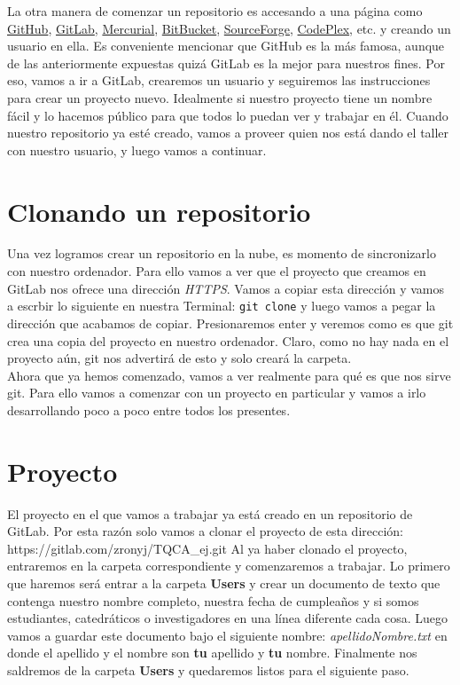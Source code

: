 \documentclass[10pt,letterpaper]{article}
\newcommand{\inlinecode}[1]{
\colorbox{light-gray}{\texttt{#1}}
}
\begin{document}
La otra manera de comenzar un repositorio es accesando a una p\'agina como \href{https://github.com/}{GitHub}, \href{https://gitlab.com/}{GitLab}, \href{https://mercurial.selenic.com/}{Mercurial}, \href{https://bitbucket.org/}{BitBucket}, \href{http://sourceforge.net/}{SourceForge}, \href{http://www.codeplex.com/}{CodePlex}, etc. y creando un usuario en ella. Es conveniente mencionar que GitHub es la m\'as famosa, aunque de las anteriormente expuestas quiz\'a GitLab es la mejor para nuestros fines. Por eso, vamos a ir a GitLab, crearemos un usuario y seguiremos las instrucciones para crear un proyecto nuevo. Idealmente si nuestro proyecto tiene un nombre f\'acil y lo hacemos p\'ublico para que todos lo puedan ver y trabajar en \'el. Cuando nuestro repositorio ya est\'e creado, vamos a proveer quien nos est\'a dando el taller con nuestro usuario, y luego vamos a continuar.

\section{Clonando un repositorio}
Una vez logramos crear un repositorio en la nube, es momento de sincronizarlo con nuestro ordenador. Para ello vamos a ver que el proyecto que creamos en GitLab nos ofrece una direcci\'on \emph{HTTPS}. Vamos a copiar esta direcci\'on y vamos a escrbir lo siguiente en nuestra Terminal: \inlinecode{git clone} y luego vamos a pegar la direcci\'on que acabamos de copiar. Presionaremos enter y veremos como es que git crea una copia del proyecto en nuestro ordenador. Claro, como no hay nada en el proyecto a\'un, git nos advertir\'a de esto y solo crear\'a la carpeta.\\

Ahora que ya hemos comenzado, vamos a ver realmente para qu\'e es que nos sirve git. Para ello vamos a comenzar con un proyecto en particular y vamos a irlo desarrollando poco a poco entre todos los presentes.

\section{Proyecto}
El proyecto en el que vamos a trabajar ya est\'a creado en un repositorio de GitLab. Por esta raz\'on solo vamos a clonar el proyecto de esta direcci\'on: https://gitlab.com/zronyj/TQCA\_ej.git Al ya haber clonado el proyecto, entraremos en la carpeta correspondiente y comenzaremos a trabajar. Lo primero que haremos ser\'a entrar a la carpeta \textbf{Users} y crear un documento de texto que contenga nuestro nombre completo, nuestra fecha de cumplea\~nos y si somos estudiantes, catedr\'aticos o investigadores en una l\'inea diferente cada cosa. Luego vamos a guardar este documento bajo el siguiente nombre: \emph{apellidoNombre.txt} en donde el apellido y el nombre son \textbf{tu} apellido y \textbf{tu} nombre. Finalmente nos saldremos de la carpeta \textbf{Users} y quedaremos listos para el siguiente paso.\\
\end{document}
